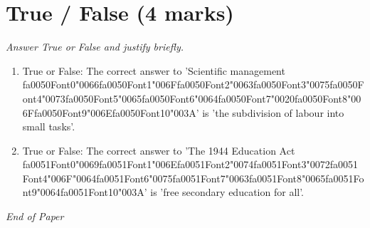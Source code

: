 \documentclass[12pt]{article}
\begin{document}
\section*{True / False (4 marks)}
\textit{Answer True or False and justify briefly.}
\begin{enumerate}[label=\arabic*.]
\item True or False: The correct answer to 'Scientific management {\csname fa0050Font0\endcsname\char"0066}{\csname fa0050Font1\endcsname\char"006F}{\csname fa0050Font2\endcsname\char"0063}{\csname fa0050Font3\endcsname\char"0075}{\csname fa0050Font4\endcsname\char"0073}{\csname fa0050Font5\endcsname\char"0065}{\csname fa0050Font6\endcsname\char"0064}{\csname fa0050Font7\endcsname\char"0020}{\csname fa0050Font8\endcsname\char"006F}{\csname fa0050Font9\endcsname\char"006E}{\csname fa0050Font10\endcsname\char"003A}' is 'the subdivision of labour into small tasks'.
\item True or False: The correct answer to 'The 1944 Education Act {\csname fa0051Font0\endcsname\char"0069}{\csname fa0051Font1\endcsname\char"006E}{\csname fa0051Font2\endcsname\char"0074}{\csname fa0051Font3\endcsname\char"0072}{\csname fa0051Font4\endcsname\char"006F}{\char"0064}{\csname fa0051Font6\endcsname\char"0075}{\csname fa0051Font7\endcsname\char"0063}{\csname fa0051Font8\endcsname\char"0065}{\csname fa0051Font9\endcsname\char"0064}{\csname fa0051Font10\endcsname\char"003A}' is 'free secondary education for all'.
\end{enumerate}

\vfill
\noindent\textit{End of Paper}
\end{document}
